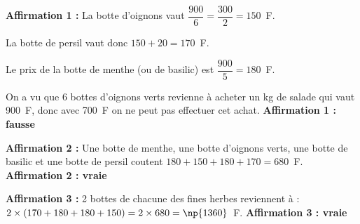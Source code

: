 
\medskip

%
%


\textbf{Affirmation 1 :} %
La botte d'oignons vaut $\dfrac{900}{6} = \dfrac{300}{2} = 150$~F.

La botte de persil vaut donc $150 + 20 = 170$~F.

Le prix de la botte de menthe (ou de basilic) est $\dfrac{900}{5} = 180$~F.

On a vu que 6 bottes d'oignons verts revienne à acheter un kg de salade qui vaut 900~F, donc avec 700~F on ne peut pas effectuer cet achat. \textbf{Affirmation 1 : fausse}

\textbf{Affirmation 2 :} %
Une botte de menthe, une botte d'oignons verts, une botte de basilic et une botte de persil coutent $180 + 150 + 180 + 170 = 680$~F. \textbf{Affirmation 2 : vraie}

\textbf{Affirmation 3 :} %
2 bottes de chacune des fines herbes reviennent à : $2\times (170 + 180 + 180 + 150) = 2 \times 680 = \np{1360}$~F. \textbf{Affirmation 3 : vraie}
\vspace{0,5cm}

